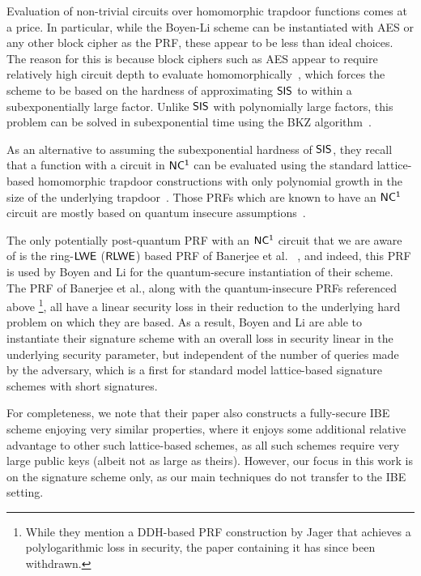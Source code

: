 Evaluation of non-trivial circuits over homomorphic trapdoor functions comes at a price. 
In particular, while the Boyen-Li scheme can be instantiated with AES or any other block cipher as the PRF, these appear to be less than ideal choices. The reason for this is because block ciphers such as AES appear to require relatively high circuit depth to evaluate homomorphically~\cite{DBLP:conf/crypto/GentryHS12}, which forces the scheme to be based on the hardness of  approximating $\mathsf{SIS}$ to within a subexponentially large factor. Unlike $\mathsf{SIS}$ with polynomially large factors, this problem can be solved in subexponential time using the BKZ algorithm~\cite{DBLP:journals/mp/SchnorrE94,DBLP:conf/asiacrypt/ChenN11}.

As an alternative to assuming the subexponential hardness of $\mathsf{SIS}$, they recall that a function with a circuit in $\mathsf{NC^{1}}$  can be evaluated using the standard lattice-based homomorphic trapdoor constructions with only
polynomial growth in the size of the underlying
trapdoor~\cite{DBLP:conf/innovations/BrakerskiV14,DBLP:conf/asiacrypt/GorbunovV15}. Those PRFs which are known to have an $\mathsf{NC^{1}}$ circuit are mostly based on quantum insecure  assumptions~\cite{DBLP:journals/jcss/NaorR99,DBLP:journals/siamcomp/NaorRR02}.

The only potentially post-quantum PRF with an $\mathsf{NC^{1}}$ circuit that we are aware of is the ring-$\mathsf{LWE}$ ($\mathsf{RLWE}$) based PRF of Banerjee et al.
~\cite{DBLP:conf/eurocrypt/BanerjeePR12}, and indeed, this PRF is used by Boyen and Li for the quantum-secure instantiation of their scheme.  The PRF of Banerjee et al., along with the quantum-insecure PRFs referenced above \footnote{While they mention a DDH-based PRF construction by Jager that achieves a polylogarithmic loss in security, the paper containing it has since been withdrawn.}, all have a linear security loss in their reduction to the underlying hard problem on which they are based. As a result, Boyen and Li are able to instantiate their signature scheme with an overall loss in security linear in the underlying security parameter, but independent of the number of queries made by the adversary, which is a first for standard model lattice-based signature schemes with short signatures.

For completeness, we note that their paper also constructs a fully-secure IBE scheme enjoying very similar properties, where it enjoys some additional relative advantage to other such lattice-based schemes, as all such schemes require very large public keys (albeit not as large as theirs). However, our focus in this work is on the signature scheme only, as our main techniques do not transfer to the IBE setting.
